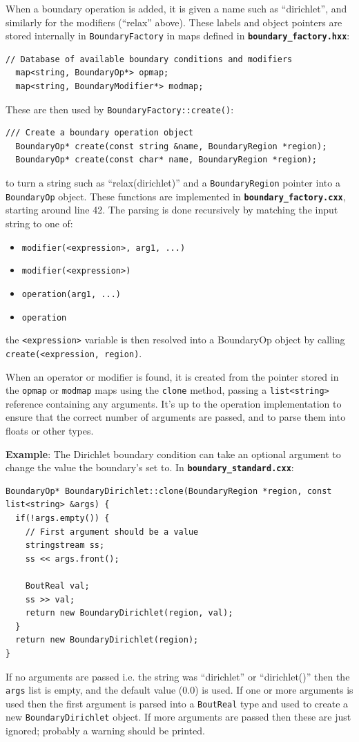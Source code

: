 \documentclass[12pt]{article}
\newcommand{\code}[1]{\texttt{#1}}
\newcommand{\file}[1]{\texttt{\bf #1}}
\begin{document}
When a boundary operation is added, it is given a name such as ``dirichlet'',
and similarly for the modifiers (``relax'' above).  These labels and object
pointers are stored internally in \code{BoundaryFactory} in maps defined in
\file{boundary\_factory.hxx}:
%
\begin{lstlisting}[firstnumber=43]
  // Database of available boundary conditions and modifiers
  map<string, BoundaryOp*> opmap;
  map<string, BoundaryModifier*> modmap;
\end{lstlisting}
%
These are then used by \code{BoundaryFactory::create()}:
%
\begin{lstlisting}[firstnumber=24]
  /// Create a boundary operation object
  BoundaryOp* create(const string &name, BoundaryRegion *region);
  BoundaryOp* create(const char* name, BoundaryRegion *region);
\end{lstlisting}
%
to turn a string such as ``relax(dirichlet)'' and a \code{BoundaryRegion}
pointer into a \code{BoundaryOp} object. These functions are implemented in
\file{boundary\_factory.cxx}, starting around line 42. The parsing is done
recursively by matching the input string to one of:
%
\begin{itemize}
\item \code{modifier(<expression>, arg1, ...)}
\item \code{modifier(<expression>)}
\item \code{operation(arg1, ...)}
\item \code{operation}
\end{itemize}
%
the \code{<expression>} variable is then resolved into a BoundaryOp object by
calling \code{create(<expression, region)}.

When an operator or modifier is found, it is created from the pointer stored in
the \code{opmap} or \code{modmap} maps using the \code{clone} method, passing a
\code{list<string>} reference containing any arguments. It's up to the
operation implementation to ensure that the correct number of arguments are
passed, and to parse them into floats or other types.

{\bf Example}: The Dirichlet boundary condition can take an optional argument
to change the value the boundary's set to. In \file{boundary\_standard.cxx}:
%
%
\begin{lstlisting}[firstnumber=13]
BoundaryOp* BoundaryDirichlet::clone(BoundaryRegion *region, const list<string> &args) {
  if(!args.empty()) {
    // First argument should be a value
    stringstream ss;
    ss << args.front();

    BoutReal val;
    ss >> val;
    return new BoundaryDirichlet(region, val);
  }
  return new BoundaryDirichlet(region);
}
\end{lstlisting}
%
If no arguments are passed i.e. the string was ``dirichlet'' or ``dirichlet()''
then the \code{args} list is empty, and the default value (0.0) is used.  If
one or more arguments is used then the first argument is parsed into a
\code{BoutReal} type and used to create a new \code{BoundaryDirichlet} object.
If more arguments are passed then these are just ignored; probably a warning
should be printed.
\end{document}
